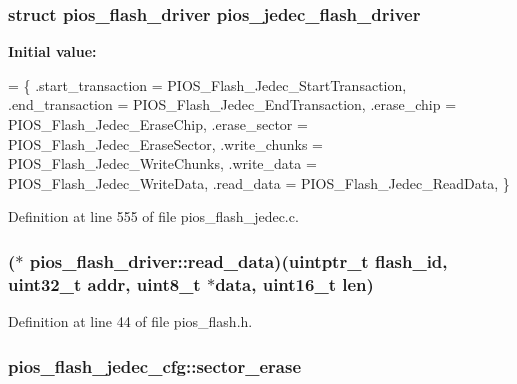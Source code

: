 \hypertarget{group___p_i_o_s___f_l_a_s_h_gab3923a09f07a535164fd799434276f27}{
\subsubsection[{pios\-\_\-jedec\-\_\-flash\-\_\-driver}]{\setlength{\rightskip}{0pt plus 5cm}struct {\bf pios\-\_\-flash\-\_\-driver} pios\-\_\-jedec\-\_\-flash\-\_\-driver}}\label{group___p_i_o_s___f_l_a_s_h_gab3923a09f07a535164fd799434276f27}
{\bfseries Initial value\-:}
\begin{DoxyCode}
= \{
        .start\_transaction = PIOS\_Flash\_Jedec\_StartTransaction,
        .end\_transaction   = PIOS\_Flash\_Jedec\_EndTransaction,
        .erase\_chip        = PIOS\_Flash\_Jedec\_EraseChip,
        .erase\_sector      = PIOS\_Flash\_Jedec\_EraseSector,
        .write\_chunks      = PIOS\_Flash\_Jedec\_WriteChunks,
        .write\_data        = PIOS\_Flash\_Jedec\_WriteData,
        .read\_data         = PIOS\_Flash\_Jedec\_ReadData,
\}
\end{DoxyCode}


Definition at line 555 of file pios\-\_\-flash\-\_\-jedec.\-c.

\hypertarget{group___p_i_o_s___f_l_a_s_h_ga5499ff7cdf896098a6eb43f2f32dc40a}{
\subsubsection[{read\-\_\-data}]{($\ast$ pios\-\_\-flash\-\_\-driver\-::read\-\_\-data)(uintptr\-\_\-t flash\-\_\-id, {\bf uint32\-\_\-t} {\bf addr}, {\bf uint8\-\_\-t} $\ast${\bf data}, {\bf uint16\-\_\-t} {\bf len})}}\label{group___p_i_o_s___f_l_a_s_h_ga5499ff7cdf896098a6eb43f2f32dc40a}


Definition at line 44 of file pios\-\_\-flash.\-h.

\hypertarget{group___p_i_o_s___f_l_a_s_h_gae824eeb4a55e49fa84a48f1d43ae788c}{
\subsubsection[{sector\-\_\-erase}]{ pios\-\_\-flash\-\_\-jedec\-\_\-cfg\-::sector\-\_\-erase}}\label{group___p_i_o_s___f_l_a_s_h_gae824eeb4a55e49fa84a48f1d43ae788c}


